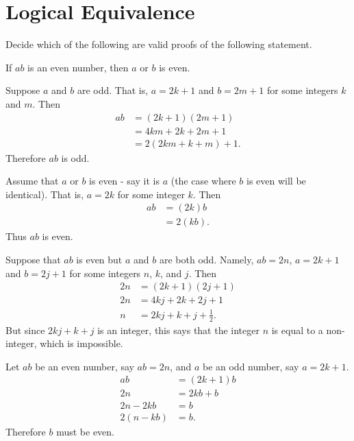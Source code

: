 \documentclass[12pt]{article}
\begin{document}
\newpage
\section{Logical Equivalence}\label{sec:logical-equiv}

\begin{activity} Decide which of the following are valid proofs of the following statement.

\begin{center}
If $a b$ is an even number, then $a$ or $b$ is even.
\end{center}

\begin{questions}
\question
Suppose $a$ and $b$ are odd.  That is, $a=2k+1$ and $b=2m+1$ for some integers $k$ and $m$. Then
\begin{align*}
ab &=(2k+1)(2m+1)\\
&=4km+2k+2m+1\\
&=2(2km+k+m)+1.
\end{align*}
Therefore $ab$ is odd.
\vfill

\question
Assume that $a$ or $b$ is even - say it is $a$ (the case where $b$ is even will be identical). That is, $a=2k$ for some integer $k$. Then
\begin{align*}
ab &=(2k)b\\
&=2(kb).
\end{align*}
Thus $ab$ is even.
\vfill

\question
Suppose that $ab$ is even but $a$ and $b$ are both odd. Namely, $ab = 2n$, $a=2k+1$ and $b=2j+1$ for some integers $n$, $k$, and $j$. Then
\begin{align*}
2n &=(2k+1)(2j+1)\\
2n &=4kj+2k+2j+1\\
n &= 2kj+k+j+\frac{1}{2}.
\end{align*}
But since $2kj+k+j$ is an integer, this says that the integer $n$ is equal to a non-integer, which is impossible.
\vfill

\question
Let $ab$ be an even number, say $ab=2n$, and $a$ be an odd number, say $a=2k+1$. %
\begin{align*}
ab &=(2k+1)b\\
2n &=2kb+b\\
2n-2kb&=b\\
2(n-kb)&=b.
\end{align*}
Therefore $b$ must be even.
\end{questions}
\end{activity}
\end{document}
